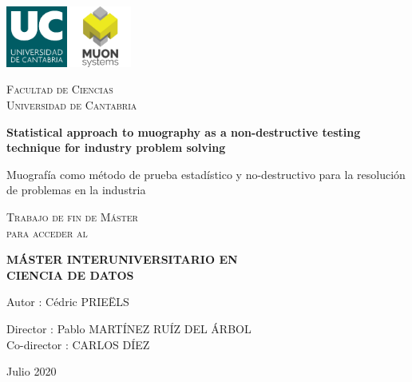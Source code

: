 \documentclass[a4paper, 11pt]{report}
\begin{document}

\begin{titlepage}

	\centering
	\includegraphics[width=0.15\textwidth]{figs/image_UC.png} \hspace{20pt} \includegraphics[width=0.15\textwidth]{figs/muonSystems.png} \par\vspace{1cm}
	{\scshape\LARGE Facultad de Ciencias \\ Universidad de Cantabria \par}
	
	\vspace{1.5cm}
	
	{\huge\bfseries Statistical approach to muography as a non-destructive testing technique for \newline industry problem solving}
	
	\vspace{0.6cm}
		
	{\LARGE Muograf\'ia como m\'etodo de prueba estad\'istico y no-destructivo para la resoluci\'on de problemas en la industria \par}
	
	\vspace{2.6cm}
	{\scshape\Large Trabajo de fin de M\'aster \\ para acceder al \par}
	\vspace{0.3cm}
	{\scshape\Large \textbf{M\'ASTER INTERUNIVERSITARIO EN \\ CIENCIA DE DATOS} \par}
	
	\begin{flushright}
	
	\vspace{2.6cm}
	{\Large Autor : C\'edric PRIE\"ELS\par}
	{\Large Director : Pablo MART\'INEZ RU\'IZ DEL \'ARBOL\\}
	{\Large Co-director : CARLOS D\'IEZ\\}
	\vspace{0.5cm}
	{\Large Julio 2020\par}
	\vfill
	
	\end{flushright}

\end{titlepage}
\end{document}
